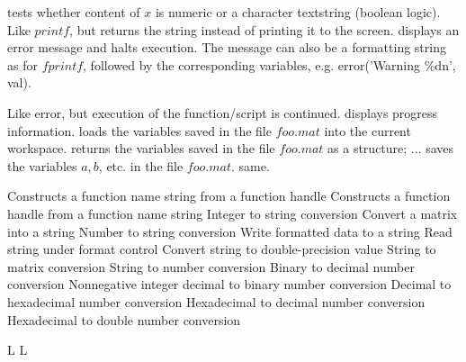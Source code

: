 	{tests whether content of $x$ is numeric or a character textstring (boolean logic).}
	{Like $printf$, but returns the string instead of printing it to the screen.}
	{displays an error message and halts execution. The message
can also be a formatting string as for $fprintf$, followed by the corresponding
variables, e.g. error('Warning \bs \%d\bs n', val).}

	{Like error, but execution of the function/script is continued. }
	{displays progress information.}
	{loads the variables saved in the file $foo.mat$ into the current workspace.}
	{returns the variables saved in the file $foo.mat$ as a structure;}
	{... saves the variables $a, b$, etc. in the file $foo.mat$.}
	{same.}

	{Constructs a function name string from a function handle}
	{Constructs a function handle from a function name string}
	{Integer to string conversion}
	{Convert a matrix into a string}
	{Number to string conversion}
	{Write formatted data to a string}
	{Read string under format control}
	{Convert string to double-precision value}
	{String to matrix conversion}
	{String to number conversion}
	{Binary to decimal number conversion}
	{Nonnegative integer decimal to binary number conversion}
	{Decimal to hexadecimal number conversion}
	{Hexadecimal to decimal number conversion}
	{Hexadecimal to double number conversion}


% 
\copyrightnotice

\supereject
\if L\lr \else\null\vfill\eject\fi
\if L\lr \else\null\vfill\eject\fi
\bye

